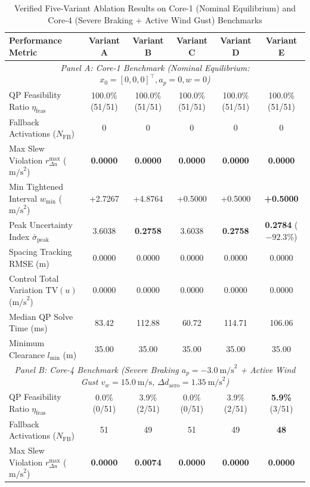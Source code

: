 \documentclass[journal]{IEEEtran}
\begin{document}
\begin{table}[t]
\centering
\caption{Verified Five-Variant Ablation Results on Core-1 (Nominal Equilibrium) and Core-4 (Severe Braking + Active Wind Gust) Benchmarks}
\label{tab:ablation_core1_4}
\begin{tabular}{lccccc}
\toprule
\textbf{Performance Metric} & \textbf{Variant A} & \textbf{Variant B} & \textbf{Variant C} & \textbf{Variant D} & \textbf{Variant E} \\
\midrule
\multicolumn{6}{c}{\textit{Panel A: Core-1 Benchmark (Nominal Equilibrium: $x_0 = [0, 0, 0]^\top, a_p = 0, w = 0$)}} \\
\midrule
QP Feasibility Ratio $\eta_{\mathrm{feas}}$ & 100.0\% (51/51) & 100.0\% (51/51) & 100.0\% (51/51) & 100.0\% (51/51) & 100.0\% (51/51) \\
Fallback Activations ($N_{\mathrm{FB}}$) & 0 & 0 & 0 & 0 & 0 \\
Max Slew Violation $r_{\Delta u}^{\max}$ ($\text{m/s}^2$) & \textbf{0.0000} & \textbf{0.0000} & \textbf{0.0000} & \textbf{0.0000} & \textbf{0.0000} \\
Min Tightened Interval $w_{\min}$ ($\text{m/s}^2$) & +2.7267 & +4.8764 & +0.5000 & +0.5000 & \textbf{+0.5000} \\
Peak Uncertainty Index $\bar\sigma_{\mathrm{peak}}$ & 3.6038 & \textbf{0.2758} & 3.6038 & \textbf{0.2758} & \textbf{0.2784} ($-92.3\%$) \\
Spacing Tracking RMSE (m) & 0.0000 & 0.0000 & 0.0000 & 0.0000 & 0.0000 \\
Control Total Variation $\mathrm{TV}(u)$ ($\text{m/s}^2$) & 0.0000 & 0.0000 & 0.0000 & 0.0000 & 0.0000 \\
Median QP Solve Time (ms) & 83.42 & 112.88 & 60.72 & 114.71 & 106.06 \\
Minimum Clearance $l_{\min}$ (m) & 35.00 & 35.00 & 35.00 & 35.00 & 35.00 \\
\midrule
\multicolumn{6}{c}{\textit{Panel B: Core-4 Benchmark (Severe Braking $a_p = -3.0~\text{m/s}^2$ + Active Wind Gust $v_w = 15.0~\text{m/s}$, $\Delta d_{\mathrm{aero}} = 1.35~\text{m/s}^2$)}} \\
\midrule
QP Feasibility Ratio $\eta_{\mathrm{feas}}$ & 0.0\% (0/51) & 3.9\% (2/51) & 0.0\% (0/51) & 3.9\% (2/51) & \textbf{5.9\%} (3/51) \\
Fallback Activations ($N_{\mathrm{FB}}$) & 51 & 49 & 51 & 49 & \textbf{48} \\
Max Slew Violation $r_{\Delta u}^{\max}$ ($\text{m/s}^2$) & \textbf{0.0000} & \textbf{0.0074} & \textbf{0.0000} & \textbf{0.0000} & \textbf{0.0000} \\

\end{tabular}
\end{table}
\end{document}
